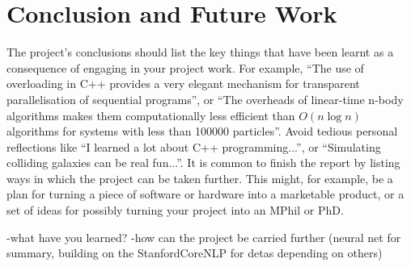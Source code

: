 \chapter{Conclusion and Future Work}

The project's conclusions should list the key things that have been learnt as a consequence of engaging in your project work. For example, ``The use of overloading in C++ provides a very elegant mechanism for transparent parallelisation of sequential programs'', or ``The overheads of linear-time n-body algorithms makes them computationally less efficient than $O(n \log n)$ algorithms for systems with less than 100000 particles''. Avoid tedious personal reflections like ``I learned a lot about C++ programming...'', or ``Simulating colliding galaxies can be real fun...''. It is common to finish the report by listing ways in which the project can be taken further. This might, for example, be a plan for turning a piece of software or hardware into a marketable product, or a set of ideas for possibly turning your project into an MPhil or PhD.

-what have you learned?
-how can the project be carried further (neural net for summary, building on the StanfordCoreNLP for detas depending on others)
